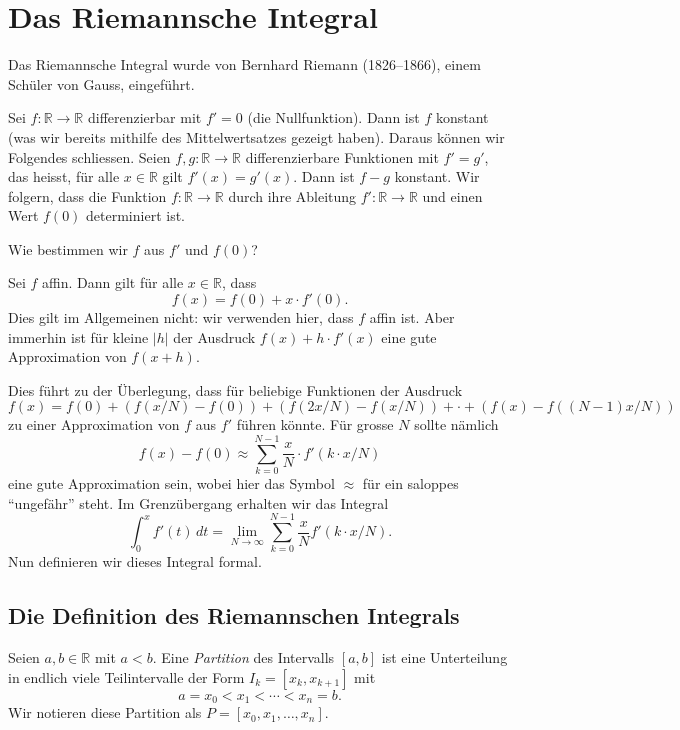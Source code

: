 \documentclass[../main.tex]{subfiles}
\begin{document}
\chapter{Das Riemannsche Integral}
Das Riemannsche Integral wurde
von Bernhard Riemann (1826--1866), einem Schüler von Gauss, eingeführt. %

Sei $f \colon \mathbb{R} \to \mathbb{R}$ differenzierbar
mit $f' = 0$ (die Nullfunktion).
Dann ist $f$ konstant (was wir bereits mithilfe des
Mittelwertsatzes gezeigt haben). Daraus können wir
Folgendes schliessen.
Seien $f, g \colon \mathbb{R} \to \mathbb{R}$ 
differenzierbare
Funktionen mit
$f' = g'$, das heisst, für alle $x \in \mathbb{R}$
gilt $f'(x) = g'(x)$.
Dann ist $f - g$ konstant.
Wir folgern, dass die Funktion $f \colon \mathbb{R} \to \mathbb{R}$ 
durch ihre Ableitung $f' \colon \mathbb{R} \to \mathbb{R}$ 
und einen Wert $f(0)$ determiniert ist.

\begin{question}
  Wie bestimmen wir $f$ aus $f'$ 
  und $f(0)$?
\end{question}

\begin{specialcase}
  Sei $f$ affin. Dann gilt für alle
  $x \in \mathbb{R}$, dass
  \[
    f(x) = f(0) + x \cdot f'(0).
  \]
  Dies gilt im Allgemeinen nicht: wir verwenden
  hier, dass $f$ affin ist.
  Aber immerhin ist für kleine $|h|$
  der Ausdruck $f(x) + h \cdot f'(x)$ eine
  gute Approximation von $f(x + h)$.
\end{specialcase}

Dies führt zu der Überlegung, dass für beliebige
Funktionen der Ausdruck
\[
  f(x) = f(0) + (f(x/N) - f(0))
  + (f(2x/N) - f(x/N)) + \cdot
  + (f(x) - f((N-1)x/N))
\]
zu einer Approximation von $f$ aus
$f'$ führen könnte. Für grosse $N$ 
sollte nämlich
\[
  f(x) - f(0) \approx \sum_{k = 0}^{N - 1} 
  \frac{x}{N} \cdot f'(k \cdot x / N)
\]
eine gute Approximation sein, wobei
hier das Symbol $\approx$ für ein
saloppes ``ungefähr'' steht.
Im Grenzübergang erhalten wir das
Integral
\[
  \int_{0}^{x} f'(t) \, dt =
  \lim_{N \to \infty} \sum_{k = 0}^{N - 1} \frac{x}{N}
  f'(k \cdot x/N).
\]
Nun definieren wir dieses Integral formal.

\section{Die Definition des Riemannschen Integrals}\label{sec:riemann-definition}
\begin{definition}
  Seien $a,b \in \mathbb{R}$
  mit $a < b$. Eine \emph{Partition} des Intervalls
  $[a, b]$ ist eine Unterteilung in
  endlich viele Teilintervalle der
  Form
  $I_k = [x_k, x_{k  + 1}]$ mit
  \[
    a = x_0 < x_1 < \cdots < x_n = b.
  \]
  Wir notieren diese Partition als
  $P = [x_0, x_1, \dots, x_n]$.
\end{definition}
\end{document}
